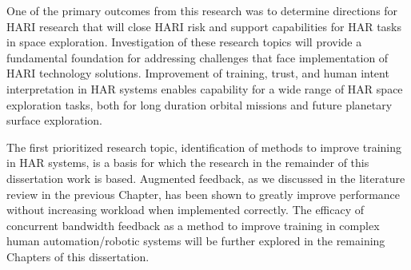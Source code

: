 One of the primary outcomes from this research was to determine directions for HARI research that will close HARI risk and support capabilities for HAR tasks in space exploration.
Investigation of these research topics will provide a fundamental foundation for addressing challenges that face implementation of HARI technology solutions.
Improvement of training, trust, and human intent interpretation in HAR systems enables capability for a wide range of HAR space exploration tasks, both for long duration orbital missions and future planetary surface exploration.

The first prioritized research topic, identification of methods to improve training in HAR systems, is a basis for which the research in the remainder of this dissertation work is based.
Augmented feedback, as we discussed in the literature review in the previous Chapter, has been shown to greatly improve performance without increasing workload when implemented correctly.
The efficacy of concurrent bandwidth feedback as a method to improve training in complex human automation/robotic systems will be further explored in the remaining Chapters of this dissertation.
